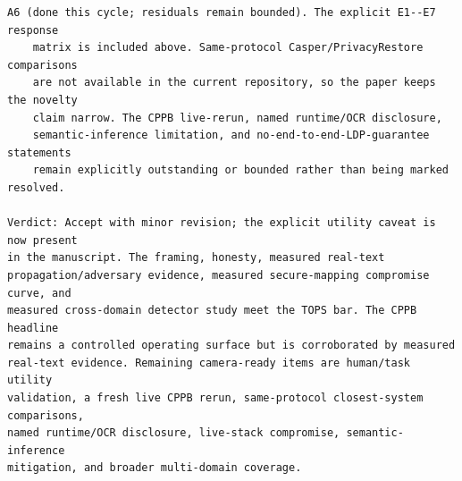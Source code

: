 \documentclass[10pt]{article}
\begin{document}
\begin{verbatim}
A6 (done this cycle; residuals remain bounded). The explicit E1--E7 response
    matrix is included above. Same-protocol Casper/PrivacyRestore comparisons
    are not available in the current repository, so the paper keeps the novelty
    claim narrow. The CPPB live-rerun, named runtime/OCR disclosure,
    semantic-inference limitation, and no-end-to-end-LDP-guarantee statements
    remain explicitly outstanding or bounded rather than being marked resolved.

Verdict: Accept with minor revision; the explicit utility caveat is now present
in the manuscript. The framing, honesty, measured real-text
propagation/adversary evidence, measured secure-mapping compromise curve, and
measured cross-domain detector study meet the TOPS bar. The CPPB headline
remains a controlled operating surface but is corroborated by measured
real-text evidence. Remaining camera-ready items are human/task utility
validation, a fresh live CPPB rerun, same-protocol closest-system comparisons,
named runtime/OCR disclosure, live-stack compromise, semantic-inference
mitigation, and broader multi-domain coverage.
\end{verbatim}
\end{document}
